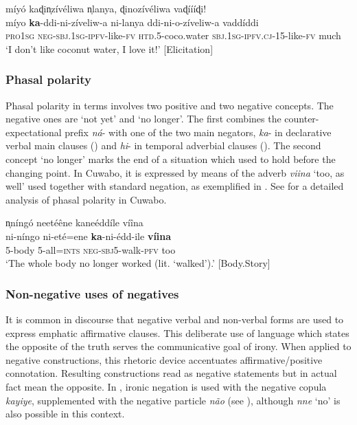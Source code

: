 \documentclass[output=paper,colorlinks=true, citecolor=brown,draftmode]{langscibook}
\begin{document}
\ea\label{ex:cuw:85} míyó kaɖin̩zívéliwa n̩lanya, ɖinozívéliwa vaɖíííɖi! \\ 
    \gll  míyo \textbf{ka}{}-ddi-ni-zíveliw-a ni-lanya ddi-ni-o-zíveliw-a vaddíddi \\
           \textsc{pro1sg} \textsc{neg-sbj.1sg-ipfv}{}-like-\textsc{fv} \textsc{htd.5}{}-coco.water \textsc{sbj.1sg-ipfv.cj-15-}like-\textsc{fv} much\\
    \glt  ‘I don’t like coconut water, I love it!’ [Elicitation]
\z 

\subsubsection{Phasal polarity}\label{sec:cuw:4.6.3}
Phasal polarity in  terms involves two positive and two negative concepts. The negative ones are ‘not yet’ and ‘no longer’. The first combines the counter-expectational prefix \textit{ná}{}- with one of the two main negators, \textit{ka}{}- in declarative verbal main clauses () and \textit{hi}{}- in temporal adverbial clauses (). The second concept ‘no longer’ marks the end of a situation which used to hold before the changing point. In Cuwabo, it is expressed by means of the adverb \textit{viina} ‘too, as well’ used together with standard negation, as exemplified in . See \citet{Guérois2021} for a detailed analysis of phasal polarity in Cuwabo.

\ea\label{ex:cuw:86} n̩níngó neetéêne kaneéddíle víîna \\  
    \gll  ni-níngo ni-eté=ene \textbf{ka}{}-ni-édd-ile \textbf{víina}  \\
          5-body 5-all=\textsc{ints} \textsc{neg-sbj}5-walk-\textsc{pfv} too \\
    \glt ‘The whole body no longer worked (lit. ‘walked’).’ [Body.Story]
\z 

\subsubsection{Non-negative uses of negatives}\label{sec:cuw:4.6.4}
It is common in discourse that negative verbal and non-verbal forms are used to express emphatic affirmative clauses. This deliberate use of language which states the opposite of the truth serves the communicative goal of irony. When applied to negative constructions, this rhetoric device accentuates affirmative/positive connotation. Resulting constructions read as negative statements but in actual fact mean the opposite. In , ironic negation is used with the negative copula \textit{kayiye}, supplemented with the negative particle \textit{não} (see ), although \textit{nne} ‘no’ is also possible in this context. 
\end{document}

